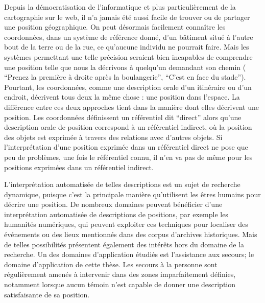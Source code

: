 Depuis la démocratisation de l'informatique et plus particulièrement
de la cartographie sur le web, il n'a jamais été aussi facile de
trouver ou de partager une position géographique. On peut désormais
facilement connaître les coordonnées, dans un système de référence
donné, d'un bâtiment situé à l'autre bout de la terre ou de la rue, ce
qu'aucune individu ne pourrait faire. Mais les systèmes permettant une
telle précision seraient bien incapables de comprendre une position
telle que nous la décrivons à quelqu’un demandant son chemin (\eg
\enquote{Prenez la première à droite après la boulangerie},
\enquote{C'est en face du stade}). Pourtant, les coordonnées, comme
une description orale d'un itinéraire ou d'un endroit, décrivent tous
deux la même chose : une position dans l'espace. La différence entre
ces deux approches tient dans la manière dont elles décrivent une
position. Les coordonnées définissent un référentiel dit
\enquote{direct} alors qu'une description orale de position correspond
à un référentiel indirect, où la position des objets est exprimée à
travers des relations avec d'autres objets. Si l’interprétation d'une
position exprimée dans un référentiel direct ne pose que peu de
problèmes, une fois le référentiel connu, il n'en va pas de même pour
les positions exprimées dans un référentiel indirect.

L'interprétation automatisée de telles descriptions est un sujet de
recherche dynamique, puisque c'est la principale manière qu'utilisent
les êtres humains pour décrire une position. De nombreux domaines
peuvent bénéficier d'une interprétation automatisée de descriptions de
positions, par exemple les humanités numériques, qui peuvent exploiter
ces techniques pour localiser des événements ou des lieux mentionnés
dans des corpus d'archives historiques. Mais de telles possibilités
présentent également des intérêts hors du domaine de la recherche. Un
des domaines d’application étudiés est l'assistance aux secours; le
domaine d’application de cette thèse. Les secours à la personne sont
régulièrement amenés à intervenir dans des zones imparfaitement
définies, notamment lorsque aucun témoin n'est capable de donner une
description satisfaisante de sa position.








